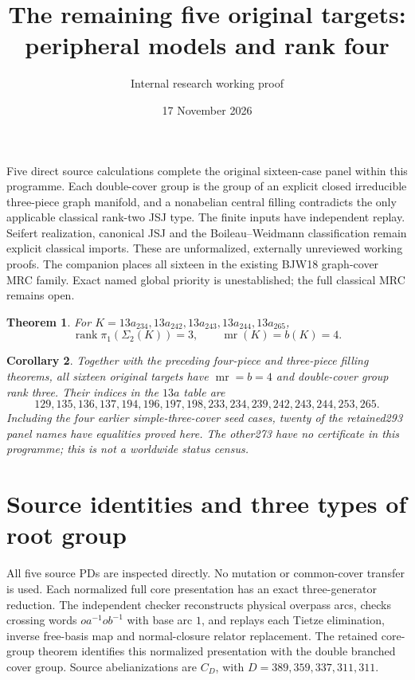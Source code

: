 \documentclass[11pt]{article}
\title{The remaining five original targets: peripheral models and rank four}
\author{Internal research working proof}
\date{17 November 2026}
\newtheorem{theorem}{Theorem}
\newtheorem{corollary}[theorem]{Corollary}
\newcommand{\rank}{\operatorname{rank}}
\newcommand{\mr}{\operatorname{mr}}
\begin{document}
\maketitle

Five direct source calculations complete the original sixteen-case panel
within this programme. Each double-cover group is the group of an explicit
closed irreducible three-piece graph manifold, and a nonabelian central
filling contradicts the only applicable classical rank-two JSJ type.
The finite inputs have independent replay. Seifert realization, canonical
JSJ and the Boileau--Weidmann classification remain explicit classical
imports. These are unformalized, externally unreviewed working proofs.
The companion 
places all sixteen in the existing BJW18 graph-cover MRC family. Exact
named global priority is unestablished; the full classical MRC remains open.

\begin{theorem}\label{thm:five}
For $K=13a_{234},13a_{242},13a_{243},13a_{244},13a_{265}$,
\[
 \rank\pi_1(\Sigma_2(K))=3,\qquad \mr(K)=b(K)=4.
\]
\end{theorem}

\begin{corollary}
Together with the preceding four-piece and three-piece filling theorems,
all sixteen original targets have $\mr=b=4$ and double-cover group rank
three. Their indices in the $13a$ table are
\[
129,135,136,137,194,196,197,198,233,234,239,242,243,244,253,265.
\]
Including the four earlier simple-three-cover seed cases, twenty of the
retained293 panel names have equalities proved here. The other273 have
no certificate in this programme; this is not a worldwide status census.
\end{corollary}

\section{Source identities and three types of root group}

All five source PDs are inspected directly. No mutation or common-cover
transfer is used. Each normalized full core presentation has an exact
three-generator reduction. The independent checker reconstructs physical
overpass arcs, checks crossing words $o a^{-1}o b^{-1}$ with base arc $1$,
and replays each Tietze elimination, inverse free-basis map and
normal-closure relator replacement. The retained core-group theorem
identifies this normalized presentation with the double branched cover
group. Source abelianizations are $C_D$, with $D=389,359,337,311,311$.
\end{document}
